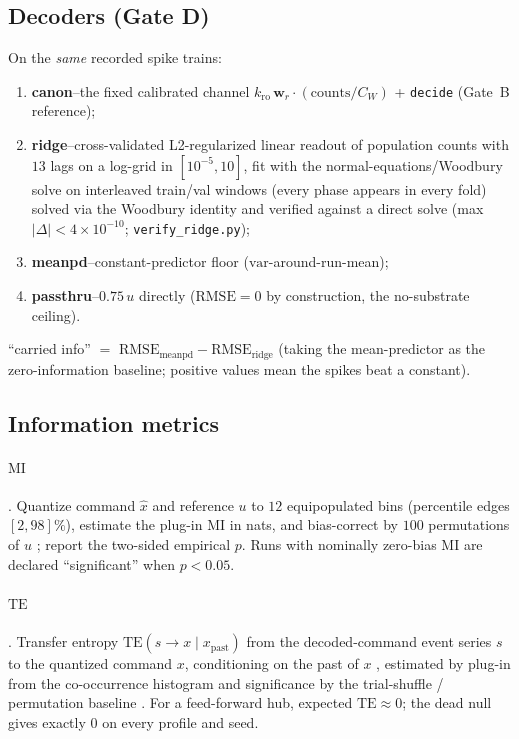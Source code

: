 \documentclass[10pt,a4paper]{article}
\newcommand{\RMSE}{\ensuremath{\mathrm{RMSE}}}
\newcommand{\MI}{\ensuremath{\mathrm{MI}}}
\newcommand{\TE}{\ensuremath{\mathrm{TE}}}
\newcommand{\palt}{0.75\,u}          %
\begin{document}
\subsection{Decoders (Gate D)}\label{sec:decoders}

On the \emph{same} recorded spike trains:
\begin{enumerate}[nosep]
\item \textbf{canon}--the fixed calibrated channel
$k_{\mathrm{ro}}\,\mathbf{w}_r\!\cdot(\mathrm{counts}/C_W)$ +
\texttt{decide} (Gate~B reference);
\item \textbf{ridge}--cross-validated L2-regularized linear readout of
population counts with $13$ lags on a log-grid in
$[10^{-5},10]$, fit with the normal-equations/Woodbury solve on
interleaved train/val windows (every phase appears in every fold)
solved via the Woodbury identity and verified against a direct solve
(max $|\Delta|<4\times10^{-10}$; \texttt{verify\_ridge.py});
\item \textbf{meanpd}--constant-predictor floor
($\mathrm{var}$-around-run-mean);
\item \textbf{passthru}--$\palt$ directly ($\RMSE=0$ by construction,
the no-substrate ceiling).
\end{enumerate}
``carried info'' $=$ $\RMSE_{\mathrm{meanpd}}-\RMSE_{\mathrm{ridge}}$
(taking the mean-predictor as the zero-information baseline; positive
values mean the spikes beat a constant).

\subsection{Information metrics}\label{sec:metrics}

\paragraph{$\MI$}. Quantize command $\hat{x}$ and reference $u$ to
$12$ equipopulated bins (percentile edges $[2,98]\%$), estimate the
plug-in $\MI$ in nats, and bias-correct by $100$ permutations of $u$
\cite{panzeri2007}; report the two-sided empirical $p$. Runs with
nominally zero-bias MI are declared ``significant'' when $p<0.05$.

\paragraph{$\TE$}. Transfer entropy $\TE(s\to x\mid x_{\mathrm{past}})$
from the decoded-command event series $s$ to the quantized command
$x$, conditioning on the past of $x$ \cite{schreiber2000}, estimated by
plug-in from the co-occurrence histogram and significance by the
trial-shuffle / permutation baseline \cite{walker2018}. For a
feed-forward hub, expected $\TE\approx0$; the dead null gives exactly
$0$ on every profile and seed.
\end{document}
